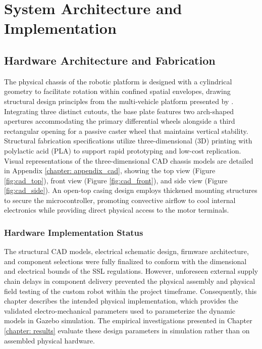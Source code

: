 \documentclass[a4paper,twoside,12pt]{report}
\begin{document}
\chapter{System Architecture and Implementation}\label{chapter: methodology}

\section{Hardware Architecture and Fabrication}

The physical chassis of the robotic platform is designed with a cylindrical geometry to facilitate rotation within confined spatial envelopes, drawing structural design principles from the multi-vehicle platform presented by \citet{yu2017portable}. Integrating three distinct cutouts, the base plate features two arch-shaped apertures accommodating the primary differential wheels alongside a third rectangular opening for a passive caster wheel that maintains vertical stability. Structural fabrication specifications utilize three-dimensional (3D) printing with polylactic acid (PLA) to support rapid prototyping and low-cost replication. Visual representations of the three-dimensional CAD chassis models are detailed in Appendix \ref{chapter: appendix_cad}, showing the top view (Figure \ref{fig:cad_top}), front view (Figure \ref{fig:cad_front}), and side view (Figure \ref{fig:cad_side}). An open-top casing design employs thickened mounting structures to secure the microcontroller, promoting convective airflow to cool internal electronics while providing direct physical access to the motor terminals.

\subsection{Hardware Implementation Status}
The structural CAD models, electrical schematic design, firmware architecture, and component selections were fully finalized to conform with the dimensional and electrical bounds of the SSL regulations. However, unforeseen external supply chain delays in component delivery prevented the physical assembly and physical field testing of the custom robot within the project timeframe. Consequently, this chapter describes the intended physical implementation, which provides the validated electro-mechanical parameters used to parameterize the dynamic models in Gazebo simulation. The empirical investigations presented in Chapter \ref{chapter: results} evaluate these design parameters in simulation rather than on assembled physical hardware.
\end{document}
